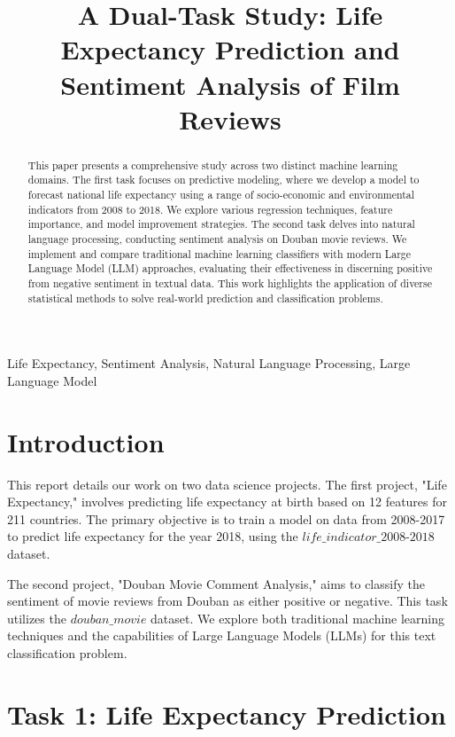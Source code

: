 \documentclass{article}
\title{A Dual-Task Study: Life Expectancy Prediction and Sentiment Analysis of Film Reviews}
\begin{document}
%
\maketitle
%
\begin{abstract}
This paper presents a comprehensive study across two distinct machine learning domains. The first task 
focuses on predictive modeling, where we develop a model to forecast national life expectancy using a
 range of socio-economic and environmental indicators from 2008 to 2018. We explore various regression 
 techniques, feature importance, and model improvement strategies. The second task delves into natural 
 language processing, conducting sentiment analysis on Douban movie reviews. We implement and compare 
 traditional machine learning classifiers with modern Large Language Model (LLM) approaches, evaluating 
 their effectiveness in discerning positive from negative sentiment in textual data. This work highlights the application of diverse statistical methods to solve real-world prediction and classification problems.
\end{abstract}
%
\begin{keywords}
Life Expectancy, Sentiment Analysis, Natural Language Processing, Large Language Model
\end{keywords}
%
\section{Introduction}
\label{sec:intro}

This report details our work on two data science projects. 
The first project, "Life Expectancy," involves predicting life expectancy at birth based on 12 features for 211 countries. 
The primary objective is to train a model on data from 2008-2017 to predict life expectancy for the year 2018, 
using the $\textit{life\_indicator\_2008-2018}$ dataset.

The second project, "Douban Movie Comment Analysis," aims to classify the sentiment of movie reviews from Douban as either positive or negative. This task utilizes the $\textit{douban\_movie}$ dataset. We explore both traditional machine learning techniques and the capabilities of Large Language Models (LLMs) for this text classification problem.

\section{Task 1: Life Expectancy Prediction}
\label{sec:task1}
\end{document}
